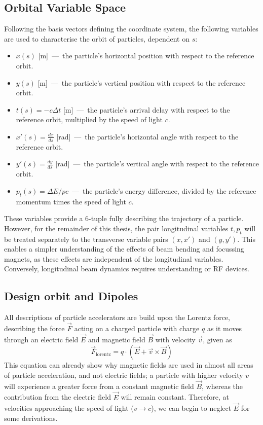 \documentclass[11pt]{report}
\begin{document}
\subsection{Orbital Variable Space}

Following the basis vectors defining the coordinate system, the following variables are used to characterise the orbit of particles, dependent on $s$:
\begin{itemize}
  \item $x(s)$ [m]~---~the particle's horizontal position with respect to the reference orbit.
  \item $y(s)$ [m]~---~the particle's vertical position with respect to the reference orbit.
  \item $t(s)=-c\Delta t$ [m]~---~the particle's arrival delay with respect to the reference orbit, multiplied by the speed of light $c$.
  \item $x'(s)=\frac{dx}{ds}$ [rad]~---~the particle's horizontal angle with respect to the reference orbit.
  \item $y'(s)=\frac{dy}{ds}$ [rad]~---~the particle's vertical angle with respect to the reference orbit.
  \item $p_t(s)=\Delta E/pc$~---~the particle's energy difference, divided by the reference momentum times the speed of light $c$.
\end{itemize}

These variables provide a 6-tuple fully describing the trajectory of a particle. However, for the remainder of this thesis, the pair longitudinal variables $t, p_t$ will be treated separately to the transverse variable pairs $(x, x')$ and $(y, y')$. This enables a simpler understanding of the effects of beam bending and focussing magnets, as these effects are independent of the longitudinal variables. Conversely, longitudinal beam dynamics requires understanding or RF devices.

\subsection{Design orbit and Dipoles}

All descriptions of particle accelerators are build upon the Lorentz force, describing the force $\vec F$ acting on a charged particle with charge $q$ as it moves through an electric field $\vec E$ and magnetic field $\vec B$ with velocity $\vec v$, given as
\begin{equation}
\vec F_{\text{lorentz}} = q\cdot(\vec E+ \vec v\times\vec B)\label{eq:lorentz}
\end{equation}
This equation can already show why magnetic fields are used in almost all areas of particle acceleration, and not electric fields; a particle with higher velocity $v$ will experience a greater force from a constant magnetic field $\vec B$, whereas the contribution from the electric field $\vec E$ will remain constant. Therefore, at velocities approaching the speed of light ($v \rightarrow c$), we can begin to neglect $\vec E$ for some derivations.
\end{document}
